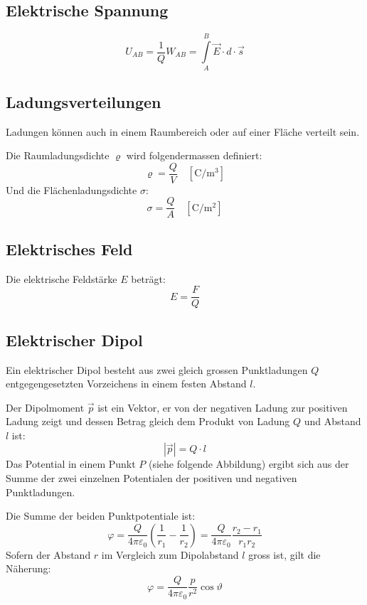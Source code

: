 \subsection{Elektrische Spannung}
\[
	U_{AB} = \frac{1}{Q} W_{AB} = \int\limits^B_A \vec{E} \cdot d \cdot \vec{s}
\]

\subsection{Ladungsverteilungen}

Ladungen können auch in einem Raumbereich oder auf einer Fläche verteilt sein.

Die Raumladungsdichte $\varrho$ wird folgendermassen definiert:
\[
	\varrho = \frac{Q}{V}
	\quad \left[ \textrm{C}/\textrm{m}^3 \right]
\]
Und die Flächenladungsdichte $\sigma$:
\[
	\sigma = \frac{Q}{A}
	\quad \left[ \textrm{C}/\textrm{m}^2 \right]
\]

\subsection{Elektrisches Feld}

Die elektrische Feldstärke $E$ beträgt:
\[
	E = \frac{F}{Q}
\]

\subsection{Elektrischer Dipol}

Ein elektrischer Dipol besteht aus zwei gleich grossen Punktladungen $Q$
entgegengesetzten Vorzeichens in einem festen Abstand $l$.

Der Dipolmoment $\vec{p}$ ist ein Vektor, er von der negativen Ladung zur
positiven Ladung zeigt und dessen Betrag gleich dem Produkt von Ladung $Q$ und
Abstand $l$ ist:
\[
	|\vec{p}| = Q \cdot l
\]
Das Potential in einem Punkt $P$ (siehe folgende Abbildung) ergibt sich aus der
Summe der zwei einzelnen Potentialen der positiven und negativen Punktladungen.

\begin{center}

\end{center}

Die Summe der beiden Punktpotentiale ist:
\[
	\varphi
		= \frac{Q}{4\pi\varepsilon_0} \left(\frac{1}{r_1} - \frac{1}{r_2}\right)
		= \frac{Q}{4\pi\varepsilon_0} \frac{r_2 - r_1}{r_1 r_2}
\]
Sofern der Abstand $r$ im Vergleich zum Dipolabstand $l$ gross ist, gilt die
Näherung:
\[
	\varphi = \frac{Q}{4\pi\varepsilon_0} \frac{p}{r^2} \cos \vartheta
\]

